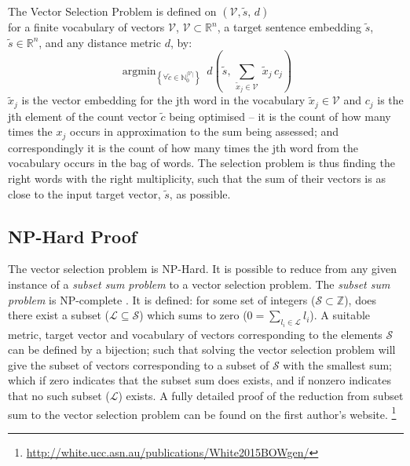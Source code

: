 \documentclass{llncs}
\DeclareMathOperator*{\argmin}{argmin}
\renewcommand{\c}{\tilde{c}}
\newcommand{\s}{\tilde{s}}
\newcommand{\x}{\tilde{x}}
\newcommand{\N}{\mathbb{N}}
\newcommand{\R}{\mathbb{R}}
\newcommand{\V}{\mathcal{V}}
\begin{document}
\begin{definition}{The Vector Selection Problem}
	is defined on $(\V, \s,\,d)$ \\for a finite vocabulary of vectors $\V$, $\V\subset{\R}^{n}$, a target sentence embedding $ \s$, $ \s\in\R^{n}$, and any distance metric $d$, by:
		\[
		\argmin_{\left\{ \forall\c\in\N_{0}^{|\V|}\right\} }\:d( \s,\,\sum_{\x_j\in\V}\:\x_{j}\,c_{j})
		\]						
		$\x_{j}$ is the vector embedding for the jth word in the vocabulary
		$\x_{j}\in\V$ and $c_j$ is the jth element of the count vector $\c$ being optimised -- it is the count of how many times the $x_j$ occurs in approximation to the sum being assessed; and correspondingly it is the count of how many times the jth word from the vocabulary occurs in the bag of words.
		The selection problem is thus finding the right words with the right multiplicity, such that the sum of their vectors is as close to the input target vector, $\s$, as possible.
\end{definition}

\subsection{NP-Hard Proof}
The vector selection problem is NP-Hard. It is possible to reduce from any given instance of a \emph{subset sum problem} to a vector selection problem. The \emph{subset sum problem} is NP-complete \parencite{karp1972reducibility}. It is defined: for some set of integers ($\mathcal{S}\subset\mathbb{Z}$), does there exist a subset ($\mathcal{L}\subseteq\mathcal{S}$) which sums to zero ($0=\sum_{l_i\in \mathcal{L}} l_i$).  A suitable metric, target vector and  vocabulary of vectors corresponding to the elements $\mathcal{S}$ can be defined by a bijection; such that solving the vector selection problem will give the subset of vectors corresponding to a subset of $\mathcal{S}$ with the smallest sum; which if zero indicates that the subset sum does exists, and if nonzero indicates that no such subset ($\mathcal{L}$) exists. A fully detailed proof of the reduction from subset sum to the vector selection problem can be found on the first author's website. \footnote{\url{http://white.ucc.asn.au/publications/White2015BOWgen/}}
\end{document}
